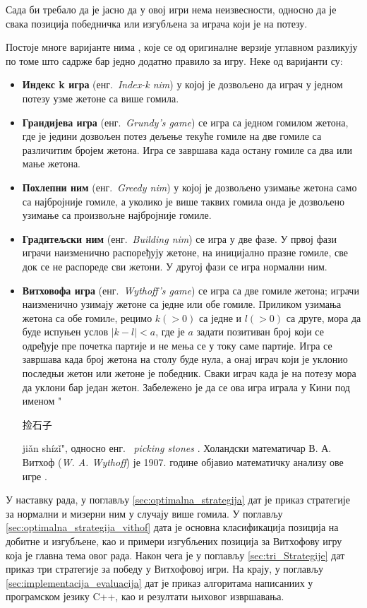 \documentclass[a4paper]{article}
\begin{document}
Сада би требало да је јасно да у овој игри нема неизвесности, односно да је свака позиција победничка или изгубљена за играча који је на потезу.

Постоје многе варијанте нима \cite{ho2011combinatorial, hitotsumatsu1968mathematics}, које се од оригиналне верзије углавном разликују по томе што садрже бар једно додатно правило за игру. Неке од варијанти су:
\begin{itemize}
	\item \textbf{Индекс k игра} (енг.{~\em Index-k nim}) у којој је дозвољено да играч у једном потезу узме жетоне са више гомила. 
	\item \textbf{Грандијева игра} (енг.{~\em Grundy's game}) се игра са једном гомилом жетона, где је једини дозвољен потез дељење текуће гомиле на две гомиле са различитим бројем жетона. Игра се завршава када остану гомиле са два или мање жетона.
	\item \textbf{Похлепни ним} (енг.{~\em Greedy nim}) у којој је дозвољено узимање жетона само са најбројније гомиле, а уколико је више таквих гомила онда је дозвољено узимање са произвољне најбројније гомиле.
	\item \textbf{Градитељски ним} (енг.{~\em Building nim}) се игра у две фазе. У првој фази играчи наизменично распоређују жетоне, на иницијално празне гомиле, све док се не распореде сви жетони. У другој фази се игра нормални ним. 
	\item \textbf{Витховофа игра} (енг.{~\em Wythoff's game}) се игра са две гомиле жетона; играчи наизменично узимају жетоне са једне или обе гомиле. Приликом узимања жетона са обе гомилe, рецимо $ k (> 0) $ са једне и $ l (> 0) $ са друге, мора да буде испуњен услов $ |k - l| < a $, где је $ a $ задати позитиван број који се одређује пре почетка партије и не мења се у току саме партије. Игра се завршава када број жетона на столу буде нула, а онај играч који је уклонио последњи жетон или жетоне је победник. Сваки играч када је на потезу мора да уклони бар један жетон. Забележено је да се ова игра играла у Кини  под именом "\begin{CJK}{UTF8}{gbsn}捡石子\end{CJK} jiǎn shízǐ", односно енг. {~\em picking stones} \cite{Yaglom}. Холандски математичар В. А. Витхоф (\textit{W. A. Wythoff}) је 1907. године објавио математичку анализу ове игре \cite{wythoff1907modification}. 
\end{itemize}

У наставку рада, у поглављу \ref{sec:optimalna_strategija} дат је приказ стратегије за нормални и мизерни ним у случају више гомила. У поглављу \ref{sec:optimalna_strategija_vithof} дата је основна класификација позиција на добитне и изгубљене, као и примери изгубљених позиција за Витхофову игру која је главна тема овог рада. Након чега је у поглављу \ref{sec:tri_Strategije} дат приказ три стратегије за победу у Витхофовој игри. На крају, у поглављу \ref{sec:implementacija_evaluacija} дат је приказ алгоритама написаниих у програмском језику C++, као и резултати њиховог извршавања.
\end{document}
